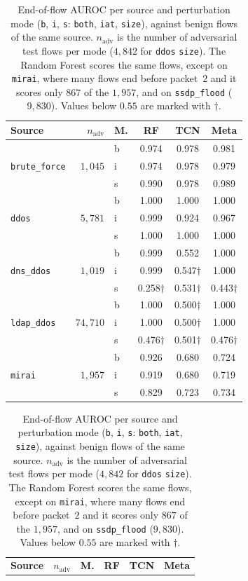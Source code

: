 \begin{table}[tp]
\centering
\caption[Per-source AUROC]{End-of-flow AUROC per source and perturbation mode
(\texttt{b}, \texttt{i}, \texttt{s}: \texttt{both}, \texttt{iat}, \texttt{size}), against
benign flows of the same source. $n_{\text{adv}}$ is the number of adversarial test
flows per mode ($4{,}842$ for \texttt{ddos} \texttt{size}). The Random Forest scores the
same flows, except on \texttt{mirai}, where many flows end before packet~$2$ and it
scores only $867$ of the $1{,}957$, and on \texttt{ssdp\_flood} ($9{,}830$). Values below
$0.55$ are marked with $\dagger$.}
\label{tab:eval-persource}
\footnotesize
\setlength{\tabcolsep}{3pt}
\begin{tabular}{lrl ccc}
\toprule
\textbf{Source} & $n_{\text{adv}}$ & \textbf{M.} & \textbf{RF} & \textbf{TCN} & \textbf{Meta} \\
\midrule
\multirow{3}{*}{\texttt{brute\_force}} & \multirow{3}{*}{$1{,}045$}
 & b & 0.974 & 0.978 & 0.981 \\
 & & i & 0.974 & 0.978 & 0.979 \\
 & & s & 0.990 & 0.978 & 0.989 \\
\multirow{3}{*}{\texttt{ddos}} & \multirow{3}{*}{$5{,}781$}
 & b & 1.000 & 1.000 & 1.000 \\
 & & i & 0.999 & 0.924 & 0.967 \\
 & & s & 1.000 & 1.000 & 1.000 \\
\multirow{3}{*}{\texttt{dns\_ddos}} & \multirow{3}{*}{$1{,}019$}
 & b & 0.999 & 0.552 & 1.000 \\
 & & i & 0.999 & 0.547$\dagger$ & 1.000 \\
 & & s & 0.258$\dagger$ & 0.531$\dagger$ & 0.443$\dagger$ \\
\multirow{3}{*}{\texttt{ldap\_ddos}} & \multirow{3}{*}{$74{,}710$}
 & b & 1.000 & 0.500$\dagger$ & 1.000 \\
 & & i & 1.000 & 0.500$\dagger$ & 1.000 \\
 & & s & 0.476$\dagger$ & 0.501$\dagger$ & 0.476$\dagger$ \\
\multirow{3}{*}{\texttt{mirai}} & \multirow{3}{*}{$1{,}957$}
 & b & 0.926 & 0.680 & 0.724 \\
 & & i & 0.919 & 0.680 & 0.719 \\
 & & s & 0.829 & 0.723 & 0.734 \\
\bottomrule
\end{tabular}
\hfill
\begin{tabular}{lrl ccc}
\toprule
\textbf{Source} & $n_{\text{adv}}$ & \textbf{M.} & \textbf{RF} & \textbf{TCN} & \textbf{Meta} \\

\end{tabular}
\end{table}
